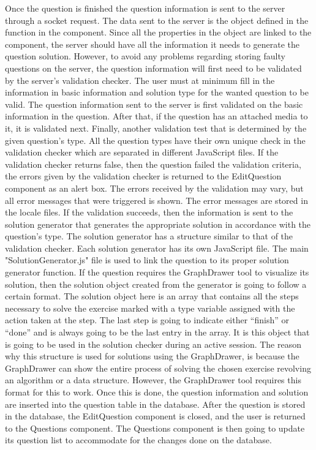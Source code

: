 Once the question is finished the question information is sent to the server through a socket request. The data sent to the server is the  object defined in the function  in the component. Since all the properties in the  object are linked to the component, the server should have all the information it needs to generate the question solution. However, to avoid any problems regarding storing faulty questions on the server, the question information will first need to be validated by the server's validation checker. The user must at minimum fill in the information in basic information and solution type for the wanted question to be valid. The question information sent to the server is first validated on the basic information in the question. After that, if the question has an attached media to it, it is validated next. Finally, another validation test that is determined by the given question's type. All the question types have their own unique check in the validation checker which are separated in different JavaScript files. If the validation checker returns false, then the question failed the validation criteria, the errors given by the validation checker is returned to the EditQuestion component as an alert box. The errors received by the validation may vary, but all error messages that were triggered is shown. The error messages are stored in the locale files. If the validation succeeds, then the information is sent to the solution generator that generates the appropriate solution in accordance with the question's type. The solution generator has a structure similar to that of the validation checker. Each solution generator has its own JavaScript file. The main "SolutionGenerator.js" file is used to link the question to its proper solution generator function. If the question requires the GraphDrawer tool to visualize its solution, then the solution object created from the generator is going to follow a certain format. The solution object here is an array that contains all the steps necessary to solve the exercise marked with a type variable assigned with the action taken at the step. The last step is going to indicate either “finish” or “done” and is always going to be the last entry in the array. It is this object that is going to be used in the solution checker during an active session. The reason why this structure is used for solutions using the GraphDrawer, is because the GraphDrawer can show the entire process of solving the chosen exercise revolving an algorithm or a data structure. However, the GraphDrawer tool requires this format for this to work.  Once this is done, the question information and solution are inserted into the question table in the database. After the question is stored in the database, the EditQuestion component is closed, and the user is returned to the Questions component. The Questions component is then going to update its question list to accommodate for the changes done on the database.
